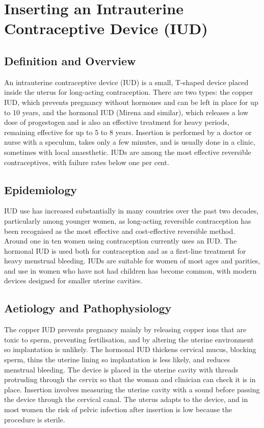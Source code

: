 \chapter{Inserting an Intrauterine Contraceptive Device (IUD)}

\section*{Definition and Overview}
An intrauterine contraceptive device (IUD) is a small, T-shaped device placed inside the uterus for long-acting contraception. There are two types: the copper IUD, which prevents pregnancy without hormones and can be left in place for up to 10 years, and the hormonal IUD (Mirena and similar), which releases a low dose of progestogen and is also an effective treatment for heavy periods, remaining effective for up to 5 to 8 years. Insertion is performed by a doctor or nurse with a speculum, takes only a few minutes, and is usually done in a clinic, sometimes with local anaesthetic. IUDs are among the most effective reversible contraceptives, with failure rates below one per cent.

\section*{Epidemiology}
IUD use has increased substantially in many countries over the past two decades, particularly among younger women, as long-acting reversible contraception has been recognised as the most effective and cost-effective reversible method. Around one in ten women using contraception currently uses an IUD. The hormonal IUD is used both for contraception and as a first-line treatment for heavy menstrual bleeding. IUDs are suitable for women of most ages and parities, and use in women who have not had children has become common, with modern devices designed for smaller uterine cavities.

\section*{Aetiology and Pathophysiology}
The copper IUD prevents pregnancy mainly by releasing copper ions that are toxic to sperm, preventing fertilisation, and by altering the uterine environment so implantation is unlikely. The hormonal IUD thickens cervical mucus, blocking sperm, thins the uterine lining so implantation is less likely, and reduces menstrual bleeding. The device is placed in the uterine cavity with threads protruding through the cervix so that the woman and clinician can check it is in place. Insertion involves measuring the uterine cavity with a sound before passing the device through the cervical canal. The uterus adapts to the device, and in most women the risk of pelvic infection after insertion is low because the procedure is sterile.

